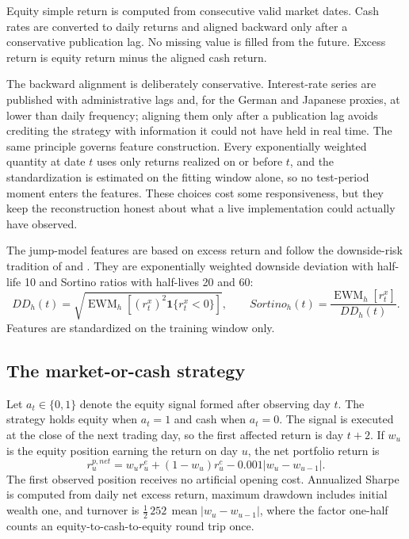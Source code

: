 \documentclass[11pt]{article}
\newcommand{\ind}{\mathbf{1}}
\begin{document}
Equity simple return is computed from consecutive valid market dates. Cash rates
are converted to daily returns and aligned backward only after a conservative
publication lag. No missing value is filled from the future. Excess return is
equity return minus the aligned cash return.

The backward alignment is deliberately conservative. Interest-rate series are
published with administrative lags and, for the German and Japanese proxies, at
lower than daily frequency; aligning them only after a publication lag avoids
crediting the strategy with information it could not have held in real time. The
same principle governs feature construction. Every exponentially weighted
quantity at date $t$ uses only returns realized on or before $t$, and the
standardization is estimated on the fitting window alone, so no test-period
moment enters the features. These choices cost some responsiveness, but they keep
the reconstruction honest about what a live implementation could actually have
observed.

The jump-model features are based on excess return and follow the downside-risk
tradition of \citet{roy1952} and \citet{markowitz1959}. They are exponentially
weighted downside deviation with half-life 10 and Sortino ratios with half-lives
20 and 60:
\begin{equation}
DD_h(t)=\sqrt{\operatorname{EWM}_h\!\left[(r_t^x)^2\ind\{r_t^x<0\}\right]},
\qquad
Sortino_h(t)=\frac{\operatorname{EWM}_h[r_t^x]}{DD_h(t)}.
\end{equation}
Features are standardized on the training window only.

\subsection{The market-or-cash strategy}

Let $a_t\in\{0,1\}$ denote the equity signal formed after observing day $t$. The
strategy holds equity when $a_t=1$ and cash when $a_t=0$. The signal is executed
at the close of the next trading day, so the first affected return is day $t+2$.
If $w_u$ is the equity position earning the return on day $u$, the net portfolio
return is
\begin{equation}
r^{p,net}_u=w_u r^e_u+(1-w_u)r^c_u-0.001\lvert w_u-w_{u-1}\rvert.
\end{equation}
The first observed position receives no artificial opening cost. Annualized
Sharpe is computed from daily net excess return, maximum drawdown includes
initial wealth one, and turnover is
$\tfrac{1}{2}\,252\,\operatorname{mean}\lvert w_u-w_{u-1}\rvert$, where the
factor one-half counts an equity-to-cash-to-equity round trip once.
\end{document}
